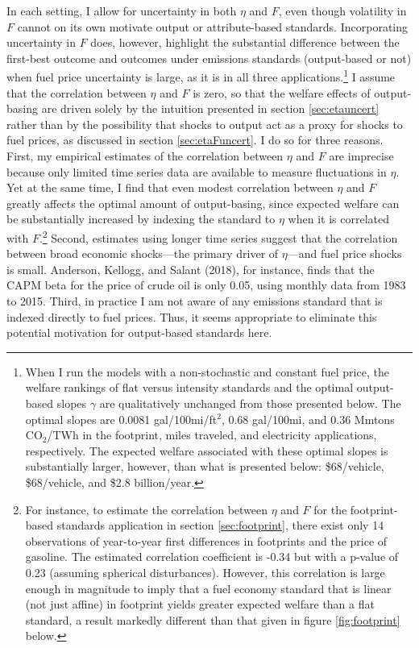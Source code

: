 \documentclass[12pt]{article}
\begin{document}
In each setting, I allow for uncertainty in both $\eta$ and $F$, even though volatility in $F$ cannot on its own motivate output or attribute-based standards. Incorporating uncertainty in $F$  does, however, highlight the substantial difference between the first-best outcome and outcomes under emissions standards (output-based or not) when fuel price uncertainty is large, as it is in all three applications.\footnote{When I run the models with a non-stochastic and constant fuel price, the welfare rankings of flat versus intensity standards and the optimal output-based slopes $\gamma$ are qualitatively unchanged from those presented below. The optimal slopes are 0.0081 gal/100mi/ft$^2$, 0.68 gal/100mi, and 0.36 Mmtons CO$_2$/TWh in the footprint, miles traveled, and electricity applications, respectively. The expected welfare associated with these optimal slopes is substantially larger, however, than what is presented below: \$68/vehicle, \$68/vehicle, and \$2.8 billion/year.} I assume that the correlation between $\eta$ and $F$ is zero, so that the welfare effects of output-basing are driven solely by the intuition presented in section \ref{sec:etauncert} rather than by the possibility that shocks to output act as a proxy for shocks to fuel prices, as discussed in section \ref{sec:etaFuncert}. I do so for three reasons. First, my empirical estimates of the correlation between $\eta$ and $F$ are imprecise because only limited time series data are available to measure fluctuations in $\eta$. Yet at the same time, I find that even modest correlation between $\eta$ and $F$ greatly affects the optimal amount of output-basing, since expected welfare can be substantially increased by indexing the standard to $\eta$ when it is correlated with $F$.\footnote{For instance, to estimate the correlation between $\eta$ and $F$ for the footprint-based standards application in section \ref{sec:footprint}, there exist only 14 observations of year-to-year first differences in footprints and the price of gasoline. The estimated correlation coefficient is -0.34 but with a p-value of 0.23 (assuming spherical disturbances). However, this correlation is large enough in magnitude to imply that a fuel economy standard that is linear (not just affine) in footprint yields greater expected welfare than a flat standard, a result markedly different than that given in figure \ref{fig:footprint} below.} Second, estimates using longer time series suggest that the correlation between broad economic shocks---the primary driver of $\eta$---and fuel price shocks is small. Anderson, Kellogg, and Salant (2018), for instance, finds that the CAPM beta for the price of crude oil is only 0.05, using monthly data from 1983 to 2015. Third, in practice I am not aware of any emissions standard that is indexed directly to fuel prices. Thus, it seems appropriate to eliminate this potential motivation for output-based standards here.
\end{document}
